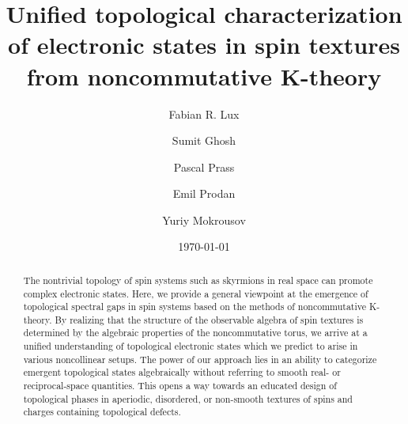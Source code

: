 \documentclass[
    10pt,
    aps,
    prl,
    twocolumn,
    floatfix,
    superscriptaddress
]{revtex4-2}
\begin{document}

\setcounter{secnumdepth}{2} 


\title{
\texorpdfstring{
    Unified  topological characterization of electronic states in spin textures \\ from noncommutative K-theory
    }
    {
    Unified  topological characterization of electronic states in spin textures from noncommutative K-theory
    }
}

\author{Fabian R. Lux}
    \affiliation{\mainz}
    \affiliation{\nyc}

\author{Sumit Ghosh}
   \affiliation{\pgi} 
   
\author{Pascal Prass}
    \affiliation{\mainz}
    
\author{Emil Prodan}
    \affiliation{\nyc}
    
\author{Yuriy Mokrousov}
    \affiliation{\mainz}
    \affiliation{\pgi}

\date{\today}

\begin{abstract}
The nontrivial topology of spin systems such as skyrmions in real space can promote complex electronic states.
Here, we provide a general viewpoint at the emergence of topological spectral gaps in spin systems based on the methods of noncommutative K-theory. 
By realizing that the structure of the observable algebra of spin textures is determined by the algebraic properties of the noncommutative torus, we arrive at a unified understanding of topological electronic states which we predict to arise in various noncollinear setups. 
The power of our approach lies in an ability to categorize emergent topological states algebraically without referring to smooth real- or reciprocal-space quantities. 
This opens a way towards an educated design of topological phases in aperiodic, disordered, or non-smooth textures of spins and charges containing topological defects. 
\end{abstract}


\maketitle

\end{document}

